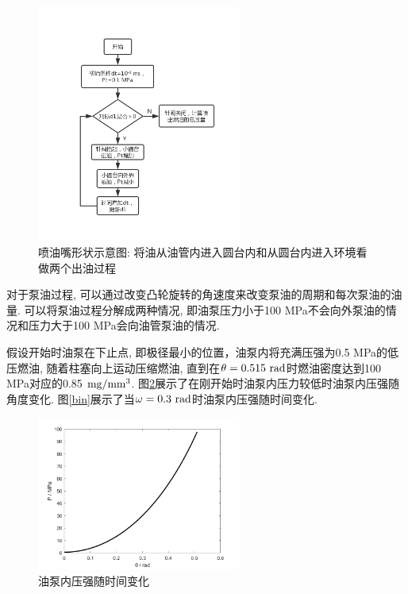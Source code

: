 \documentclass{cumcmthesis}
\begin{document}
\begin{figure}[htbp]
    \centering
    \includegraphics[width=0.6\textwidth]{bout.jpg} 
    \caption{喷油嘴形状示意图: 将油从油管内进入圆台内和从圆台内进入环境看做两个出油过程}
    \label{bout}
\end{figure}

对于泵油过程, 可以通过改变凸轮旋转的角速度来改变泵油的周期和每次泵油的油量. 可以将泵油过程分解成两种情况, 即油泵压力小于100 MPa不会向外泵油的情况和压力大于100 MPa会向油管泵油的情况. 

假设开始时油泵在下止点, 即极径最小的位置，油泵内将充满压强为0.5 MPa的低压燃油, 随着柱塞向上运动压缩燃油, 直到在$\theta = 0.515\ \rm{rad}$时燃油密度达到100 MPa对应的0.85 $\rm mg/mm^3$. 图\ref{bin1}展示了在刚开始时油泵内压力较低时油泵内压强随角度变化. 图\ref{bin}展示了当$\omega =0.3\ \rm{rad}$时油泵内压强随时间变化. 

\begin{figure}[htbp]
    \centering
    \includegraphics[width=0.6\textwidth]{THETA_P.png} 
    \caption{油泵内压强随时间变化}
    \label{bin1}
\end{figure}
\end{document}
